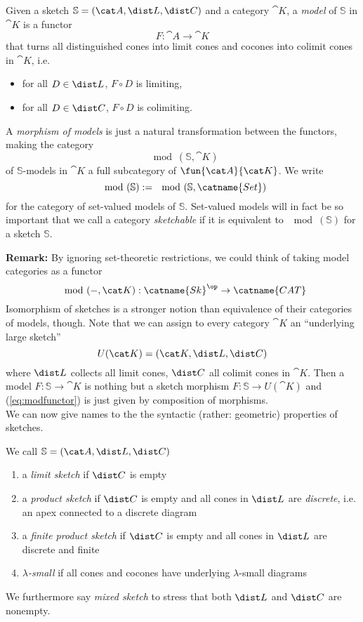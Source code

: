 \begin{Definition}
Given a sketch $\mathbb S = (\cat A, \dist L, \dist C)$ and a category $\cat K$, a \emph{model} of $\mathbb S$ in $\cat K$ is a functor
\[ F : \cat A \to \cat K \]
that turns all distinguished cones into limit cones and cocones into colimit cones in $\cat K$, i.e. \begin{itemize}
\item for all $D \in \dist L$, $F \circ D$ is limiting,
\item for all $D \in \dist C$, $F \circ D$ is colimiting.
\end{itemize}
A \emph{morphism of models} is just a natural transformation between the functors, making the category \[ \mod(\mathbb S, \cat K) \]
of $\mathbb S$-models in $\cat K$ a full subcategory of $\fun{\cat A}{\cat K}$. We write
\[ \mod(\mathbb S) := \mod(\mathbb S, \catname{Set}) \]
for the category of set-valued models of $\mathbb S$. Set-valued models will in fact be so important that we call a category \emph{sketchable} if it is equivalent to $\mod(\mathbb S)$ for a sketch $\mathbb S$.
\end{Definition}


\textbf{Remark: } By ignoring set-theoretic restrictions, we could think of taking model categories as a functor
\begin{equation}
\label{eq:modfunctor} \mod(-, \cat K) : \catname{Sk}^\op \to \catname{CAT}
\end{equation}
Isomorphism of sketches is a stronger notion than equivalence of their categories of models, though. Note that we can assign to every category $\cat K$ an ``underlying large sketch'' 
\[ U(\cat K) = (\cat K, \dist L, \dist C) \]
where $\dist L$ collects all limit cones, $\dist C$ all colimit cones in $\cat K$. Then a model $F : \mathbb S \to \cat K$ is nothing but a sketch morphism $F : \mathbb S \to U(\cat K)$ and (\ref{eq:modfunctor}) is just given by composition of morphisms. \\

We can now give names to the the syntactic (rather: geometric) properties of sketches.
\begin{Definition}
We call $\mathbb S = (\cat A, \dist L, \dist C)$
\begin{enumerate}
\item a \emph{limit sketch} if $\dist C$ is empty
\item a \emph{product sketch} if $\dist C$ is empty and all cones in $\dist L$ are \emph{discrete}, i.e. an apex connected to a discrete diagram
\item a \emph{finite product sketch} if $\dist C$ is empty and all cones in $\dist L$ are discrete and finite
\item \emph{$\lambda$-small} if all cones and cocones have underlying $\lambda$-small diagrams
\end{enumerate}
We furthermore say \emph{mixed sketch} to stress that both $\dist L$ and $\dist C$ are nonempty.
\end{Definition}

